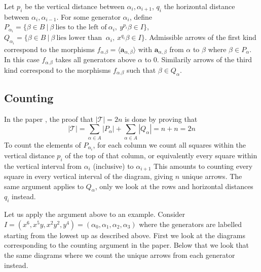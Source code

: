 \documentclass[a4page]{article}
\theoremstyle{definition}
\begin{document}
Let $ p_{i} $ be the vertical distance between $ \alpha_{i},\alpha_{i+1} $, $ q_{i} $ the horizontal distance between $ \alpha_{i},\alpha_{i-1} $.
For some generator $ \alpha_{i}$, define $ P_{\alpha_{i}} = \{ \beta \in B \ | \ \beta \ \text{lies to the left of} \ \alpha_{i}, \ y^{p_{i}} \beta \in I \} $, $ Q_{\alpha_{i}} = \{ \beta \in B \ | \ \beta \ \text{lies lower than } \ \alpha_{i}, \ x^{q_{i}} \beta \in I \} $.
Admissible arrows of the first kind correspond to the morphisms $ f_{\alpha.\beta} = \langle \mathbf{a}_{\alpha,\beta}\rangle$ with $\mathbf{a}_{\alpha,\beta}$ from $\alpha$ to $\beta$ where $\beta \in P_{\alpha} $.
In this case $f_{\alpha.\beta}$ takes all generators above $\alpha$ to $0$.
Similarily arrows of the third kind correspond to the morphisms $ f_{\alpha.\beta} $ such that $\beta \in Q_{\alpha} $.
\subsection{Counting}

In the paper \cite{nested_schemes}, the proof that $ | \mathcal{T} | = 2n $ is done by proving that $$ | \mathcal{T} | = \sum_{\alpha \in A}|P_{\alpha}| + \sum_{\alpha \in A}|Q_{\alpha}| = n + n = 2n $$ 
To count the elements of $ P_{\alpha_{i}}$, for each column we count all squares within the vertical distance $ p_{i} $ of the top of that column, or equivalently every square within the vertical interval from $\alpha_i$ (inclusive) to $\alpha_{i+1}$
This amounts to counting every square in every vertical interval of the diagram, giving $n$ unique arrows.
The same argument applies to $ Q_{\alpha} $, only we look at the rows and horizontal distances $ q_{i} $ instead.

Let us apply the argument above to an example.
Consider $ I = (x^{6},x^{5}y,x^{2}y^{2},y^{4}) = (\alpha_{0},\alpha_{1},\alpha_{2},\alpha_3) $ where the generators are labelled starting from the lowest up as described above.
First we look at the diagrams corresponding to the counting argument in the paper.
Below that we look that the same diagrams where we count the unique arrows from each generator instead.
\end{document}
